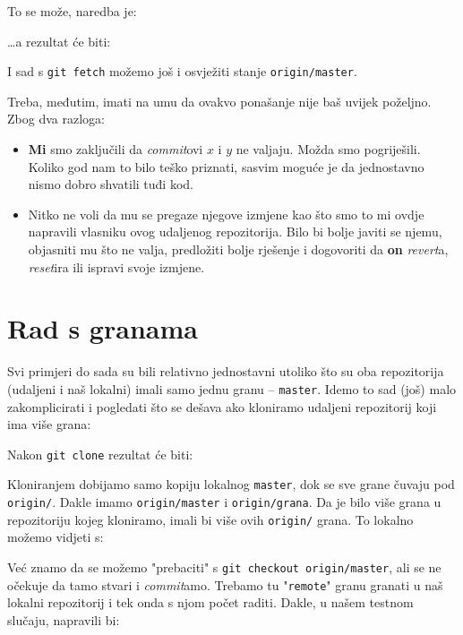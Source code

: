 To se može, naredba je:


\dots{}a rezultat će biti:



I sad s \verb+git fetch+ možemo još i osvježiti stanje \verb+origin/master+.

Treba, međutim, imati na umu da ovakvo ponašanje nije baš uvijek poželjno. 
Zbog dva razloga:

\begin{itemize}
	\item \textbf{Mi} smo zaključili da \emph{commit}ovi $x$ i $y$ ne valjaju. Možda smo pogriješili. Koliko god nam to bilo teško priznati, sasvim moguće je da jednostavno nismo dobro shvatili tuđi kod.
	\item Nitko ne voli da mu se pregaze njegove izmjene kao što smo to mi ovdje napravili vlasniku ovog udaljenog repozitorija. Bilo bi bolje javiti se njemu, objasniti mu što ne valja, predložiti bolje rješenje i dogovoriti da \textbf{on} \emph{revert}a, \emph{reset}ira ili ispravi svoje izmjene.
\end{itemize}

\section*{Rad s granama}

Svi primjeri do sada su bili relativno jednostavni utoliko što su oba repozitorija (udaljeni i naš lokalni) imali samo jednu granu -- \verb+master+.
Idemo to sad (još) malo zakomplicirati i pogledati što se dešava ako kloniramo udaljeni repozitorij koji ima više grana:

Nakon \verb+git clone+ rezultat će biti:



Kloniranjem dobijamo samo kopiju lokalnog \verb+master+, dok se sve grane čuvaju pod \verb+origin/+. Dakle imamo \verb+origin/master+ i \verb+origin/grana+.
Da je bilo više grana u repozitoriju kojeg kloniramo, imali bi više ovih \verb+origin/+ grana.
To lokalno možemo vidjeti s:



Već znamo da se možemo "prebaciti" s \verb+git checkout origin/master+, ali se ne očekuje da tamo stvari i \emph{commit}amo.
Trebamo tu "\verb+remote+" granu granati u naš lokalni repozitorij i tek onda s njom počet raditi.
Dakle, u našem testnom slučaju, napravili bi:

